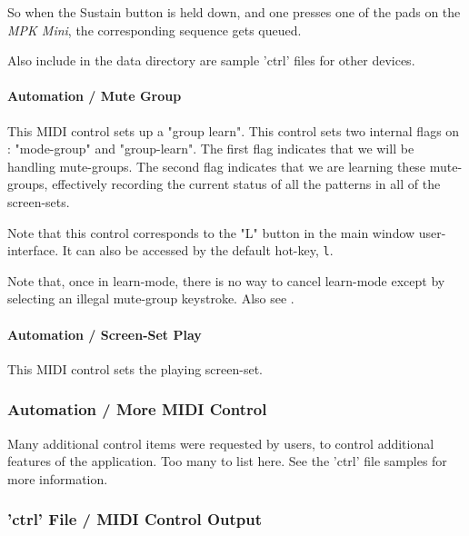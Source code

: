    So when the Sustain button is held down, and one presses one of the pads
   on the \textsl{MPK Mini}, the corresponding sequence gets queued.

   Also include in the data directory are sample 'ctrl' files for other devices.

\paragraph{Automation / Mute Group}
\label{paragraph:configuration_midi_ctrl_modgmute}

   This MIDI control sets up a "group learn".
   This control sets two internal flags on : "mode-group" and "group-learn".
   The first flag indicates that we will be handling mute-groups.
   The second flag indicates that we are learning these mute-groups,
   effectively recording the current status of all the patterns in all of the
   screen-sets.

   Note that this control corresponds to the "L" button in the main window
   user-interface.
   It can also be accessed by the default hot-key, \texttt{l}.

   Note that, once in learn-mode, there is no way to cancel learn-mode
   except by selecting an illegal mute-group keystroke.
   Also see .

\paragraph{Automation / Screen-Set Play}
\label{paragraph:configuration_midi_ctrl_ssplay}

This MIDI control sets the playing screen-set.

\subsubsection{Automation / More MIDI Control}
\label{subsubsec:configuration_midi_ctrl_automationex}

   Many additional control items were requested by users, to control
   additional features of the application.  Too many to list here.
   See the 'ctrl' file samples for more information.

\subsubsection{'ctrl' File / MIDI Control Output}
\label{subsubsec:configuration_ctrl_midi_control_out}

